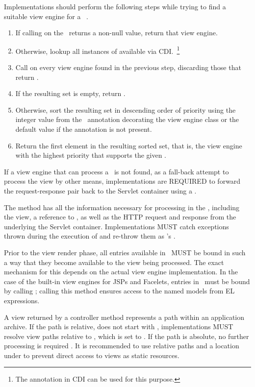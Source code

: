 Implementations should perform the following steps while trying to find
a suitable view engine for a \Viewable\ .

\begin{enumerate}
\item If calling  on the \Viewable\ returns a non-null value, return
that view engine.
\item Otherwise, lookup all instances of  available via 
CDI.~\footnote{The  annotation in CDI can be used for this purpose.}
\item Call  on every view engine found in the previous step, discarding
those that return .
\item If the resulting set is empty, return .
\item Otherwise, sort the resulting set in descending order of priority using the integer value 
from the \Priority\ annotation decorating the view engine class or the default value
  if the annotation is not present.
\item Return the first element in the resulting sorted set, that is, the view engine with
the highest priority that supports the given \Viewable.
\end{enumerate}

If a view engine that can process a \Viewable\ is not found, as a fall-back attempt to 
process the view by other means, implementations are 
REQUIRED to forward the request-response pair back to the Servlet container using a 
 .

The  method has all the information necessary for processing
in the ,
including the view, a reference to \Models, as well as the HTTP request and response
 from the underlying the Servlet container. Implementations MUST catch
exceptions thrown during the execution of  and re-throw them as 
's .

Prior to the view render phase, all entries available in \Models\ MUST be bound in
such a way that they become available to the view being processed. The exact mechanism
for this depends on the actual view engine implementation. In the case of the built-in
view engines for JSPs and Facelets, entries in \Models\ must be bound by calling
; calling this method ensures
access to the named models from EL expressions.

A view returned by a controller method represents a path within an
application archive. If the path is relative, does not start with \code{/}, implementations 
MUST resolve view paths relative to , 
which is set to . If the path is absolute, no further processing
is required . It is recommended to use relative paths and a 
location under  to prevent direct access to views as static resources.



